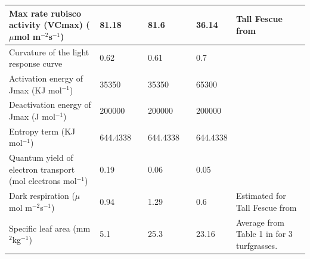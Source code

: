 \documentclass[final,3p,times,authoryear]{elsarticle}
\begin{document}
\begin{center}
\begin{table}[!htbp]
{\begin{tabular}{ |  p{3.5cm} | p{1.1cm} | p{2.5cm} | p{1.1cm} | p{2.5cm} | p{1.1cm} | p{2.5cm} | }
Max rate rubisco activity (VCmax) ($\mu$mol m$^{-2}$s$^{-1}$)& 81.18& \cite{Coutts2014a}  & 81.6&\cite{Coutts2016}& 36.14& Tall Fescue from \cite{Yu2012a}\\ \hline
Curvature of the light response curve &0.62& \cite{Coutts2014a}   &0.61 &\cite{Coutts2016}&0.7 &\cite{Gilmanov2007}\\ \hline
Activation energy of Jmax (KJ mol$^{-1}$)& 35350& \cite{Diaz-Espejo2006}  & 35350& \cite{Bernacchi2001}& 65300& \cite{Bernacchi2001}\\ \hline
Deactivation energy of Jmax (J mol$^{-1}$)& 200000 &\cite{Medlyn2005a}  & 200000& \cite{Medlyn2005a}& 200000& \cite{Medlyn2005a}\\ \hline
Entropy term (KJ mol$^{-1}$)& 644.4338& \cite{Medlyn2005a}   & 644.4338& \cite{Medlyn2005a}& 644.4338& \cite{Medlyn2005a}\\ \hline
Quantum yield of electron transport (mol electrons mol$^{-1}$)& 0.19& \cite{Sierra2012}  &0.06&\cite{Coutts2016}&0.05& \cite{Monson1982}\\ \hline
Dark respiration ($\mu$mol m$^{-2}$s$^{-1}$)& 0.94& \cite{Coutts2014a}  &1.29 &\cite{Coutts2016}&0.6  & Estimated for Tall Fescue from \cite{Yu2012a}\\ \hline
Specific leaf area (mm$^{2}$kg$^{-1}$)&5.1 &\cite{Mariscal2000}  &25.3 &\cite{Wright2000}&23.16 &Average from Table 1 in \cite{Bijoor2014} for 3 turfgrasses.\\ \hline
\end{tabular} 
}
\end{table}
\end{center}




%

\end{document}
